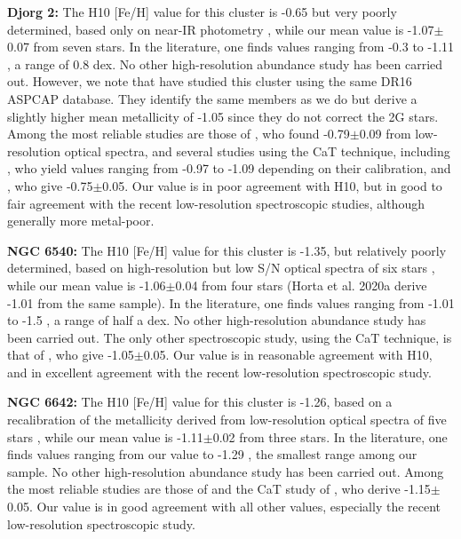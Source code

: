 \documentclass[onecolumn]{aa}
\begin{document}
{\bf Djorg 2:}
The H10 [Fe/H] value for this cluster is -0.65 but very poorly determined, based only on near-IR photometry \citep{Valenti2010}, while our mean value is -1.07$\pm$0.07 from seven stars. In the literature, one finds values ranging from -0.3 \citep{Bica1998} to -1.11 \citep{Ortolani2019}, a range of 0.8 dex. No other high-resolution abundance study has been carried out. 
However, we note that \cite{Kunder2020} have studied this cluster using the same DR16 ASPCAP database. They identify the same members as we do but derive a slightly higher mean metallicity of -1.05 since they do not correct the 2G stars.
Among the most reliable studies are those of   
\cite{Dias2016}, who found -0.79$\pm$0.09 from low-resolution optical spectra, and several studies using the CaT technique,
including \cite{Vasquez2018}, who yield values ranging from -0.97 to -1.09 depending on their calibration, and 
\citet{Geisler2021}, who give -0.75$\pm$0.05.
Our value is in poor agreement with H10, but in good to fair agreement with the recent low-resolution spectroscopic studies, although generally more metal-poor. 

{\bf NGC 6540:}
The H10 [Fe/H] value for this cluster is -1.35, but relatively poorly determined, based on high-resolution but low S/N optical spectra of six stars \citep{Cote1999}, while our mean value is -1.06$\pm$0.04 from four stars (Horta et al. 2020a derive -1.01 from the same sample). In the literature, one finds values ranging from -1.01 to -1.5 \citep{Vulic2018}, a range of half a dex. No other high-resolution abundance study has been carried out. The only other spectroscopic study, using the CaT technique, is that of \citet{Geisler2021}, who give -1.05$\pm$0.05.
Our value is in reasonable agreement with H10, and in excellent  agreement with the recent low-resolution spectroscopic study.

{\bf NGC 6642:}
The H10 [Fe/H] value for this cluster is -1.26, based on a recalibration of the metallicity derived from low-resolution optical spectra of five stars \citep{Minniti1995b}, while our mean value is -1.11$\pm$0.02 from three stars. In the literature, one finds values ranging from our value to -1.29 \citep{Minniti1995b},
the smallest range among our sample. No other high-resolution abundance study has been carried out. Among the most reliable studies are those of \citet{Minniti1995b} and  the CaT study of \citet{Geisler2021}, who derive -1.15$\pm$0.05.
Our value is in good agreement with all other values, especially the recent low-resolution spectroscopic study. 
\end{document}
